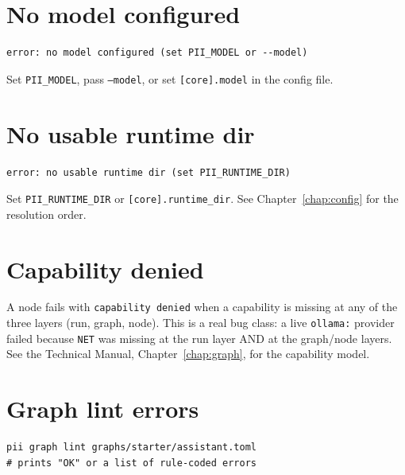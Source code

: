 \documentclass[
	fontsize=10pt,
	twoside=false,
	secnumdepth=2,
	open=any,
]{kaobook}
\begin{document}
\section{No model configured}

\begin{cmdbox}[Error]
\begin{lstlisting}
error: no model configured (set PII_MODEL or --model)
\end{lstlisting}
\end{cmdbox}

Set \texttt{PII\_MODEL}, pass \texttt{--model}, or set
\texttt{[core].model} in the config file.

\section{No usable runtime dir}

\begin{cmdbox}[Error]
\begin{lstlisting}
error: no usable runtime dir (set PII_RUNTIME_DIR)
\end{lstlisting}
\end{cmdbox}

Set \texttt{PII\_RUNTIME\_DIR} or \texttt{[core].runtime\_dir}. See
Chapter~\ref{chap:config} for the resolution order.

\section{Capability denied}

A node fails with \texttt{capability denied} when a capability is missing
at any of the three layers (run, graph, node). This is a real bug class:
a live \texttt{ollama:} provider failed because \texttt{NET} was missing
at the run layer AND at the graph/node layers. See the Technical Manual,
Chapter~\ref{chap:graph}, for the capability model.

\section{Graph lint errors}

\begin{cmdbox}[Lint]
\begin{lstlisting}
pii graph lint graphs/starter/assistant.toml
# prints "OK" or a list of rule-coded errors
\end{lstlisting}
\end{cmdbox}
\end{document}
